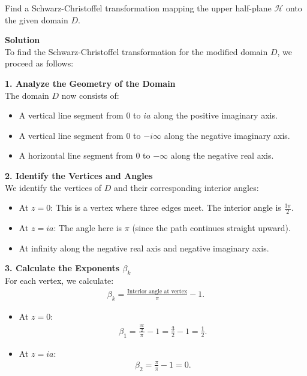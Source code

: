 \begin{example}
    Find a Schwarz-Christoffel transformation mapping the upper half-plane $\mathcal{H}$ onto the given domain $D$.

    \textbf{Solution} \\

    To find the Schwarz-Christoffel transformation for the modified domain $D$, we proceed as follows:

    \textbf{1. Analyze the Geometry of the Domain} \\

    The domain $D$ now consists of:
    \begin{itemize}
        \item A vertical line segment from $0$ to $i a$ along the positive imaginary axis.
        \item A vertical line segment from $0$ to $-i \infty$ along the negative imaginary axis.
        \item A horizontal line segment from $0$ to $-\infty$ along the negative real axis.
    \end{itemize}

    \textbf{2. Identify the Vertices and Angles} \\

    We identify the vertices of $D$ and their corresponding interior angles:
    \begin{itemize}
        \item At $z = 0$: This is a vertex where three edges meet. The interior angle is $\frac{3\pi}{2}$.
        \item At $z = i a$: The angle here is $\pi$ (since the path continues straight upward).
        \item At infinity along the negative real axis and negative imaginary axis.
    \end{itemize}

    \textbf{3. Calculate the Exponents $\beta_k$} \\

    For each vertex, we calculate:
    \begin{align*}
        \beta_k = \frac{\text{Interior angle at vertex}}{\pi} - 1.
    \end{align*}

    \begin{itemize}
        \item At $z = 0$:
              \begin{align*}
                  \beta_1 = \frac{\frac{3\pi}{2}}{\pi} - 1 = \frac{3}{2} - 1 = \frac{1}{2}.
              \end{align*}
        \item At $z = i a$:
              \begin{align*}
                  \beta_2 = \frac{\pi}{\pi} - 1 = 0.
              \end{align*}
    \end{itemize}


\end{example}
